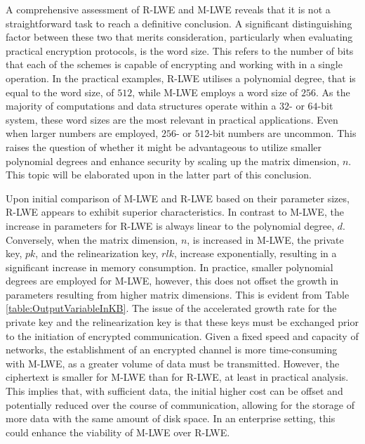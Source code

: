 A comprehensive assessment of R-LWE and M-LWE reveals that it is not a straightforward task to reach a definitive conclusion. A significant distinguishing factor between these two that merits consideration, particularly when evaluating practical encryption protocols, is the word size. This refers to the number of bits that each of the schemes is capable of encrypting and working with in a single operation. In the practical examples, R-LWE utilises a polynomial degree, that is equal to the word size, of $512$, while M-LWE employs a word size of $256$. As the majority of computations and data structures operate within a $32$- or $64$-bit system, these word sizes are the most relevant in practical applications. Even when larger numbers are employed, $256$- or $512$-bit numbers are uncommon. This raises the question of whether it might be advantageous to utilize smaller polynomial degrees and enhance security by scaling up the matrix dimension, $n$. This topic will be elaborated upon in the latter part of this conclusion.

Upon initial comparison of M-LWE and R-LWE based on their parameter sizes, R-LWE appears to exhibit superior characteristics. In contrast to M-LWE, the increase in parameters for R-LWE is always linear to the polynomial degree, $d$. Conversely, when the matrix dimension, $n$, is increased in M-LWE, the private key, $pk$, and the relinearization key, $rlk$, increase exponentially, resulting in a significant increase in memory consumption. 
In practice, smaller polynomial degrees are employed for M-LWE, however, this does not offset the growth in parameters resulting from higher matrix dimensions. This is evident from Table \ref{table:OutputVariableInKB}. The issue of the accelerated growth rate for the private key and the relinearization key is that these keys must be exchanged prior to the initiation of encrypted communication. Given a fixed speed and capacity of networks, the establishment of an encrypted channel is more time-consuming with M-LWE, as a greater volume of data must be transmitted. However, the ciphertext is smaller for M-LWE than for R-LWE, at least in practical analysis. This implies that, with sufficient data, the initial higher cost can be offset and potentially reduced over the course of communication, allowing for the storage of more data with the same amount of disk space. In an enterprise setting, this could enhance the viability of M-LWE over R-LWE. 

